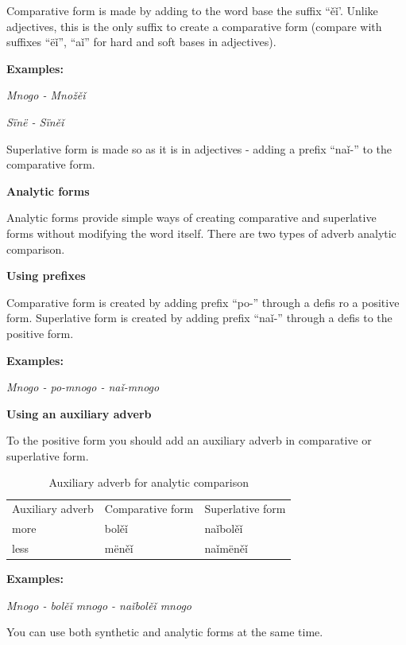 Comparative form is made by adding to the word base the suffix “ěǐ’. Unlike adjectives, this is the only suffix to create a comparative form (compare with suffixes “ëǐ”, “aǐ” for hard and soft bases in adjectives). 

\textbf{Examples:}

\textit{Mnogo - Množěǐ}

\textit{Sïnë - Sïněǐ}

Superlative form is made so as it is in adjectives - adding a prefix “naǐ-” to the comparative form.

\textbf{Analytic forms}

Analytic forms provide simple ways of creating comparative and superlative forms without modifying the word itself. There are two types of adverb analytic comparison.

\textbf{Using prefixes}

Comparative form is created by adding prefix “po-” through a defis ro a positive form. Superlative form is created by adding prefix “naǐ-” through a defis to the positive form.

\textbf{Examples:}

\textit{Mnogo - po-mnogo - naǐ-mnogo}

\textbf{Using an auxiliary adverb}

To the positive form you should add an auxiliary adverb in comparative or superlative form.

\begin{table}[!htb]
	\caption{Auxiliary adverb for analytic comparison}
	\begin{tabular}{lll}
		Auxiliary adverb
		& Comparative form
		& Superlative form \\
		more & bolěǐ & naǐbolěǐ \\
		less & mëněǐ & naǐmëněǐ \\
	\end{tabular}
\end{table}

\textbf{Examples:}

\textit{Mnogo - bolěǐ mnogo - naǐbolěǐ mnogo}

You can use both synthetic and analytic forms at the same time.
